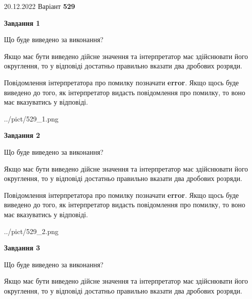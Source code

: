 \documentclass[12pt, ukrainian]{article}
\begin{document}
{20.12.2022 Варіант \No \textbf { 529 }\par}
{
\begin {Large}

{\begin {center}\textbf{Завдання 1}\end {center}}\par
Що буде виведено за виконання? \par

Якщо має бути виведено дійсне значення та інтерпретатор має здійснювати його округлення, 
то у відповіді достатньо правильно вказати два дробових розряди.

Повідомлення інтерпретатора про помилку позначати \textbf{error}.
Якщо щось буде виведено до того, як інтерпретатор видасть повідомлення про помилку, 
то воно має вказуватись у відповіді. \par

\begin{center}
	{../pict/529_1.png}
\end{center}
\newpage

{\begin {center}\textbf{Завдання 2}\end {center}}\par
Що буде виведено за виконання? \par

Якщо має бути виведено дійсне значення та інтерпретатор має здійснювати його округлення, 
то у відповіді достатньо правильно вказати два дробових розряди.

Повідомлення інтерпретатора про помилку позначати \textbf{error}.
Якщо щось буде виведено до того, як інтерпретатор видасть повідомлення про помилку, 
то воно має вказуватись у відповіді. \par

\begin{center}
	{../pict/529_2.png}
\end{center}
\newpage

{\begin {center}\textbf{Завдання 3}\end {center}}\par
Що буде виведено за виконання? \par

Якщо має бути виведено дійсне значення та інтерпретатор має здійснювати його округлення, 
то у відповіді достатньо правильно вказати два дробових розряди.


\end{Large}}
\end{document}
